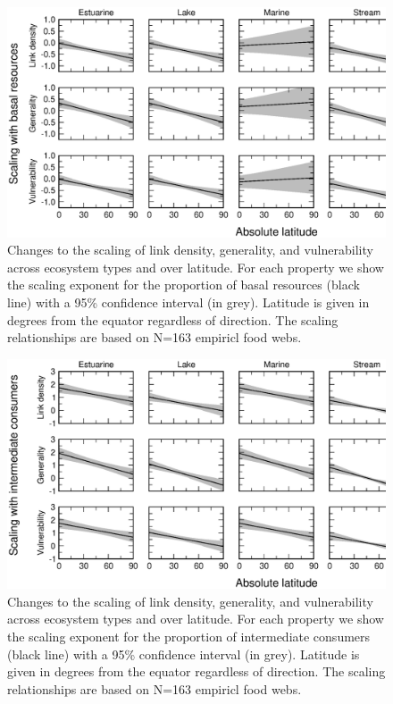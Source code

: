 \documentclass[12pt]{article}
\begin{document}
\begin{figure}[!H]
\includegraphics[width=.85\textwidth]{Figures/by_TL/marginal/B_marginal_latitude_proportions.eps}
\caption{Changes to the scaling of link density, generality, and vulnerability across ecosystem
types and over latitude. For each property we show the scaling exponent for the proportion of
basal resources (black line) with a 95\% confidence interval (in grey). Latitude is given in degrees
from the equator regardless of direction. The scaling relationships are based on N=163 empiricl food webs.}
\label{B}
\end{figure}

\newpage

\begin{figure}[h]
\includegraphics[width=.85\textwidth]{Figures/by_TL/marginal/I_marginal_latitude_proportions.eps}
\caption{Changes to the scaling of link density, generality, and vulnerability across ecosystem
types and over latitude. For each property we show the scaling exponent for the proportion of
intermediate consumers (black line) with a 95\% confidence interval (in grey). Latitude is given in degrees
from the equator regardless of direction. The scaling relationships are based on N=163 empiricl food webs.}
\label{I}
\end{figure}
\end{document}
